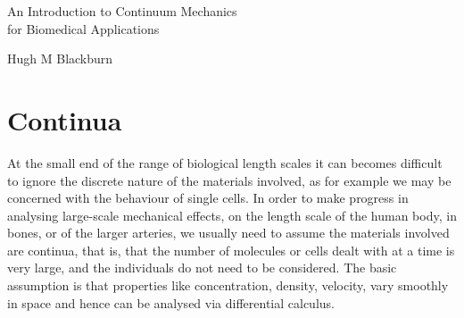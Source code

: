 \documentclass[twoside,11pt]		{report}
\begin{document}
\pagestyle{fancy}

\begin{titlepage}

\vspace*{18em}

\begin{center}
{\huge
An Introduction to Continuum Mechanics\\[5pt]
for Biomedical Applications
}

\vspace*{20em}

{\Large Hugh M Blackburn}

\end{center}

\end{titlepage}



\cleardoublepage

\chapter{Continua}
\label{ch.cont}


\lhead[\bfseries\thepage]{\rightmark}
\chead{}
\rhead[\leftmark]{\bfseries\thepage}
\cfoot{}{}

At the small end of the range of biological length scales it can
becomes difficult to ignore the discrete nature of the materials
involved, as for example we may be concerned with the behaviour of
single cells. In order to make progress in analysing large-scale
mechanical effects, \eg on the length scale of the human body, in
bones, or of the larger arteries, we usually need to assume the
materials involved are continua, that is, that the number of molecules
or cells dealt with at a time is very large, and the individuals do
not need to be considered.  The basic assumption is that properties
like concentration, density, velocity, vary smoothly in space and
hence can be analysed via differential calculus.
\end{document}
